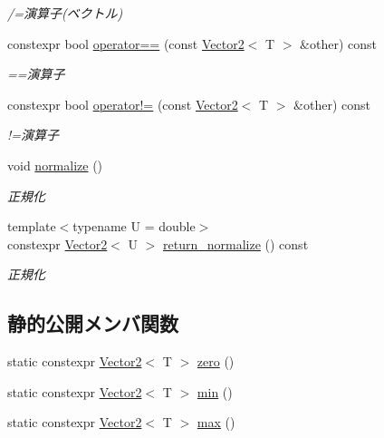 \begin{DoxyCompactItemize}
\begin{DoxyCompactList}\small\item\em /=演算子(ベクトル) \end{DoxyCompactList}\item 
constexpr bool \mbox{\hyperlink{classsaki_1_1_vector2_a72b70031ffca3596e8df06cc4e84dc51}{operator==}} (const \mbox{\hyperlink{classsaki_1_1_vector2}{Vector2}}$<$ T $>$ \&other) const
\begin{DoxyCompactList}\small\item\em ==演算子 \end{DoxyCompactList}\item 
constexpr bool \mbox{\hyperlink{classsaki_1_1_vector2_a060dff3676c9f427fba232c301e011b7}{operator!=}} (const \mbox{\hyperlink{classsaki_1_1_vector2}{Vector2}}$<$ T $>$ \&other) const
\begin{DoxyCompactList}\small\item\em !=演算子 \end{DoxyCompactList}\item 
void \mbox{\hyperlink{classsaki_1_1_vector2_a8267f8608ffad9796813856c05076d8c}{normalize}} ()
\begin{DoxyCompactList}\small\item\em 正規化 \end{DoxyCompactList}\item 
{\footnotesize template$<$typename U  = double$>$ }\\constexpr \mbox{\hyperlink{classsaki_1_1_vector2}{Vector2}}$<$ U $>$ \mbox{\hyperlink{classsaki_1_1_vector2_ad4fe2f7cb118bfad82333017c15c591a}{return\+\_\+normalize}} () const
\begin{DoxyCompactList}\small\item\em 正規化 \end{DoxyCompactList}\end{DoxyCompactItemize}
\subsection*{静的公開メンバ関数}
\begin{DoxyCompactItemize}
\item 
static constexpr \mbox{\hyperlink{classsaki_1_1_vector2}{Vector2}}$<$ T $>$ \mbox{\hyperlink{classsaki_1_1_vector2_a74ffa40e66a47ea296ba51dbb815be17}{zero}} ()
\item 
static constexpr \mbox{\hyperlink{classsaki_1_1_vector2}{Vector2}}$<$ T $>$ \mbox{\hyperlink{classsaki_1_1_vector2_a8ad62d4709258510a229f08ea7db14c8}{min}} ()
\item 
static constexpr \mbox{\hyperlink{classsaki_1_1_vector2}{Vector2}}$<$ T $>$ \mbox{\hyperlink{classsaki_1_1_vector2_ad0c75c5cf88476643a5cb31e522e065b}{max}} ()
\end{DoxyCompactItemize}
